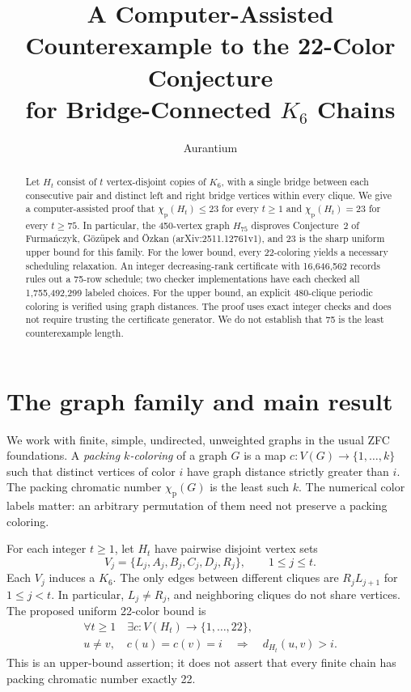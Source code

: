 \documentclass[11pt]{article}
\title{A Computer-Assisted Counterexample to the 22-Color Conjecture\protect\\
for Bridge-Connected $K_6$ Chains}
\author{Aurantium}
\date{}
\newcommand{\chip}{\chi_{\mathrm p}}
\begin{document}
\maketitle

\begin{abstract}
Let $H_t$ consist of $t$ vertex-disjoint copies of $K_6$, with a single
bridge between each consecutive pair and distinct left and right bridge
vertices within every clique. We give a computer-assisted proof that
$\chip(H_t)\leq 23$ for every $t\geq 1$ and $\chip(H_t)=23$ for every
$t\geq 75$. In particular, the 450-vertex graph $H_{75}$ disproves
Conjecture~2 of Furma\'nczyk, G\"oz\"upek and \"Ozkan
(arXiv:2511.12761v1), and 23 is the sharp uniform upper bound for this
family. For the lower bound, every 22-coloring yields a necessary
scheduling relaxation. An integer decreasing-rank certificate with
16,646,562 records rules out a 75-row schedule; two checker
implementations have each checked all 1,755,492,299 labeled choices.
For the upper bound, an explicit 480-clique periodic coloring is
verified using graph distances. The proof uses exact integer checks
and does not require trusting the certificate generator. We do not
establish that 75 is the least counterexample length.
\end{abstract}

\section{The graph family and main result}

We work with finite, simple, undirected, unweighted graphs in the usual
ZFC foundations. A \emph{packing $k$-coloring} of a graph $G$ is a map
$c:V(G)\to\{1,\ldots,k\}$ such that distinct vertices of color $i$
have graph distance strictly greater than $i$. The packing chromatic
number $\chip(G)$ is the least such $k$. The numerical color labels
matter: an arbitrary permutation of them need not preserve a packing
coloring.

For each integer $t\geq 1$, let $H_t$ have pairwise disjoint vertex sets
\[
V_j=\{L_j,A_j,B_j,C_j,D_j,R_j\},\qquad 1\leq j\leq t.
\]
Each $V_j$ induces a $K_6$. The only edges between different cliques are
$R_jL_{j+1}$ for $1\leq j<t$. In particular, $L_j\ne R_j$, and
neighboring cliques do not share vertices. The proposed uniform
22-color bound is
\begin{equation*}
\begin{gathered}
\forall t\geq 1\quad \exists c:V(H_t)\longrightarrow\{1,\ldots,22\},\\
u\ne v,\quad c(u)=c(v)=i
\quad\Longrightarrow\quad d_{H_t}(u,v)>i.
\end{gathered}
\tag{T}\label{eq:target}
\end{equation*}
This is an upper-bound assertion; it does not assert that every finite
chain has packing chromatic number exactly 22.
\end{document}
